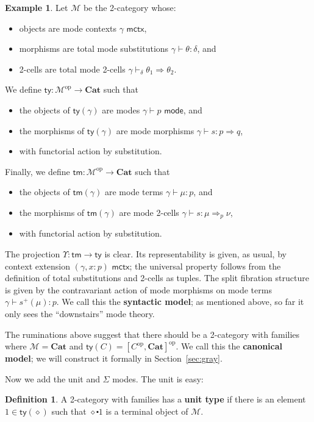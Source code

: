 \documentclass[10pt]{article}
\theoremstyle{definition}
\newtheorem{definition}{Definition}
\newtheorem{example}{Example}
\newcommand{\yields}{\vdash}
\newcommand{\tcell}{\Rightarrow}
\newcommand{\ctx}{\,\,\mathsf{mctx}}
\newcommand{\type}{\,\,\mathsf{mode}}
\newcommand\TypeTwo[4]{\ensuremath{#1 \vdash #2 :  #3 \tcell #4}}
\newcommand\TermTwoT[5]{\ensuremath{#1 \vdash {#2} : #3 \tcell_{#5} #4}}
\newcommand\TrPlus[2]{\ensuremath{{#1}^+(#2)}}
\newcommand\op{^{\mathrm{op}}}
\newcommand\Cat{\mathbf{Cat}}
\newcommand\M{\mathcal{M}}
\newcommand\Mty{\mathsf{ty}}
\newcommand\Mtm{\mathsf{tm}}
\newcommand\Ups{\Upsilon}
\newcommand\ce{\mathord{\centerdot}}
\newcommand\ec{\diamond}
\begin{document}
\begin{example}\label{eg:syn-2cwf}
  Let $\M$ be the 2-category whose:
  \begin{itemize}
  \item objects are mode contexts $\gamma \ctx$,
  \item morphisms are total mode substitutions $\gamma \yields \theta : \delta$, and
  \item 2-cells are total mode 2-cells $\gamma \yields_\delta \theta_1 \tcell \theta_2$.
  \end{itemize}
  We define $\Mty:\M\op\to\Cat$ such that
  \begin{itemize}
  \item the objects of $\Mty(\gamma)$ are modes $\gamma \yields p\type$, and
  \item the morphisms of $\Mty(\gamma)$ are mode morphisms $\TypeTwo{\gamma}{s}{p}{q}$,
  \item with functorial action by substitution.
  \end{itemize}
  Finally, we define $\Mtm:\M\op\to\Cat$ such that
  \begin{itemize}
  \item the objects of $\Mtm(\gamma)$ are mode terms $\gamma \yields \mu:p$, and
  \item the morphisms of $\Mtm(\gamma)$ are mode 2-cells $\TermTwoT{\gamma}{s}{\mu}{\nu}{p}$,
  \item with functorial action by substitution.
  \end{itemize}
  The projection $\Ups:\Mtm\to\Mty$ is clear.
  Its representability is given, as usual, by context extension $(\gamma, x:p) \ctx$; the universal property follows from the definition of total substitutions and 2-cells as tuples.
  The split fibration structure is given by the contravariant action of mode morphisms on mode terms ${\gamma \yields \TrPlus{s}{\mu} : p}$.
  We call this the \textbf{syntactic model}; as mentioned above, so far it only sees the ``downstairs'' mode theory.
\end{example}

The ruminations above suggest that there should be a 2-category with families where $\M=\Cat$ and $\Mty(C) = [C\op,\Cat]\op$.
We call this the \textbf{canonical model}; we will construct it formally in Section~\ref{sec:gray}.

Now we add the unit and $\Sigma$ modes.
The unit is easy:

\begin{definition}
  A 2-category with families has a \textbf{unit type} if there is an element $1\in \Mty(\ec)$ such that $\ec\ce 1$ is a terminal object of $\M$.
\end{definition}
\end{document}
